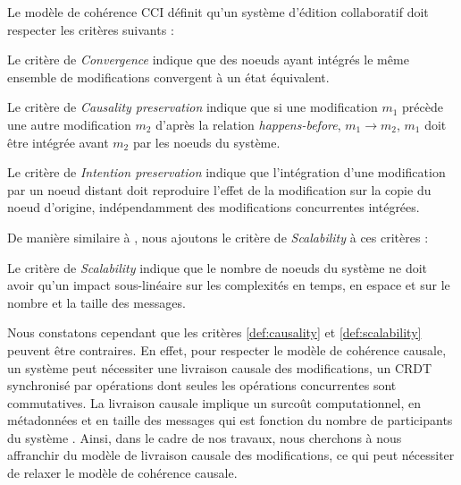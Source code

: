 \begin{definition}
  Le modèle de cohérence \ac{CCI} définit qu'un système d'édition collaboratif doit respecter les critères suivants :
  \begin{subdefinition}[Convergence]
    Le critère de \emph{Convergence} indique que des noeuds ayant intégrés le même ensemble de modifications convergent à un état équivalent.
  \end{subdefinition}
  \begin{subdefinition}
    \label{def:causality}
    Le critère de \emph{Causality preservation} indique que si une modification $m_1$ précède une autre modification $m_2$ d'après la relation \emph{happens-before}, \ie $m_1 \rightarrow m_2$, $m_1$ doit être intégrée avant $m_2$ par les noeuds du système.
  \end{subdefinition}
  \begin{subdefinition}
    Le critère de \emph{Intention preservation} indique que l'intégration d'une modification par un noeud distant doit reproduire l'effet de la modification sur la copie du noeud d'origine, indépendamment des modifications concurrentes intégrées.
  \end{subdefinition}
\end{definition}

De manière similaire à \cite{2009-logoot-weiss}, nous ajoutons le critère de \emph{Scalability} à ces critères :

\begin{definition}[Scalability]
  \label{def:scalability}
  Le critère de \emph{Scalability} indique que le nombre de noeuds du système ne doit avoir qu'un impact sous-linéaire sur les complexités en temps, en espace et sur le nombre et la taille des messages.
\end{definition}

Nous constatons cependant que les critères \ref{def:causality} et \ref{def:scalability} peuvent être contraires.
En effet, pour respecter le modèle de cohérence causale, un système peut nécessiter une livraison causale des modifications, \eg un \ac{CRDT} synchronisé par opérations dont seules les opérations concurrentes sont commutatives.
La livraison causale implique un surcoût computationnel, en métadonnées et en taille des messages qui est fonction du nombre de participants du système \cite{1991-concerning-size-logical-clocks-charron-bost}.
Ainsi, dans le cadre de nos travaux, nous cherchons à nous affranchir du modèle de livraison causale des modifications, ce qui peut nécessiter de relaxer le modèle de cohérence causale.


